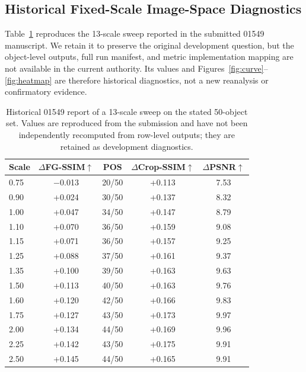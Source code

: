 \documentclass[times,twocolumn,final]{elsarticle}
\providecommand{\DIFadd}[1]{{\protect\color{blue} \sf #1}} %
\providecommand{\DIFaddbegin}{} %
\providecommand{\DIFaddend}{} %
\providecommand{\DIFaddbeginFL}{\DIFaddbegin} %
\providecommand{\DIFaddendFL}{\DIFaddend} %
\renewcommand{\DIFaddbeginFL}{}
\renewcommand{\DIFaddendFL}{}
\begin{document}
  \DIFaddbegin \subsection{Historical Fixed-Scale Image-Space Diagnostics}
\DIFaddend \label{subsec:tradeoff}

Table~\ref{tab:sweep}   \DIFaddbegin \DIFadd{reproduces the }\DIFaddend 13-scale   \DIFaddbegin \DIFadd{sweep reported in the submitted 01549 manuscript. We retain it to preserve the original development question, but the object-level outputs, full run manifest, and metric implementation mapping are not available in the current authority. Its values and Figures~\ref{fig:curve}--\ref{fig:heatmap} are therefore historical diagnostics, not a new reanalysis or confirmatory evidence}\DIFaddend .

\begin{table}[t]
\centering
  \DIFaddbeginFL \caption{Historical 01549 report of a 13-scale sweep on the stated 50-object set. Values are reproduced from the submission and have not been independently recomputed from row-level outputs; they are retained as development diagnostics.}
\DIFaddendFL \label{tab:sweep}
\small
\begin{tabular}{lcccc}
\toprule
Scale & $\Delta$FG-SSIM$\uparrow$ & POS & $\Delta$Crop-SSIM$\uparrow$ & $\Delta$PSNR$\uparrow$ \\
\midrule
0.75 & $-$0.013 & 20/50 & +0.113 & 7.53 \\
0.90 & +0.024 & 30/50 & +0.137 & 8.32 \\
1.00 & +0.047 & 34/50 & +0.147 & 8.79 \\
1.10 & +0.070 & 36/50 & +0.159 & 9.08 \\
1.15 & +0.071 & 36/50 & +0.157 & 9.25 \\
1.25 & +0.088 & 37/50 & +0.161 & 9.37 \\
1.35 & +0.100 & 39/50 & +0.163 & 9.63 \\
1.50 & +0.113 & 40/50 & +0.163 & 9.76 \\
1.60 & +0.120 & 42/50 & +0.166 & 9.83 \\
1.75 & +0.127 & 43/50 & +0.173 & 9.97 \\
2.00 & +0.134 & 44/50 & +0.169 & 9.96 \\
2.25 & +0.142 & 43/50 & +0.175 & 9.91 \\
2.50 & +0.145 & 44/50 & +0.165 & 9.91 \\
\bottomrule
\end{tabular}
\end{table}
\end{document}
